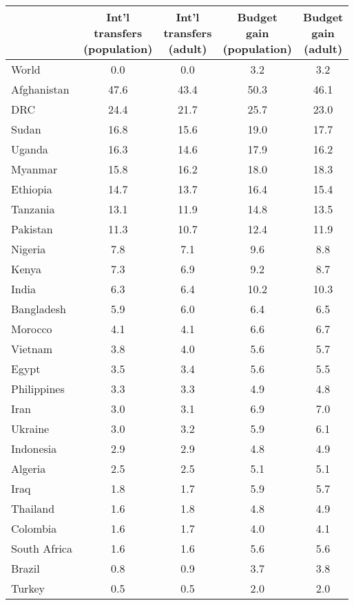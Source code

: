 
\begin{tabular}[t]{lcccc}
\toprule
  & \makecell{Int'l\\transfers\\(population)} & \makecell{Int'l\\transfers\\(adult)} & \makecell{Budget\\gain\\(population)} & \makecell{Budget\\gain\\(adult)}\\
\midrule
World & 0.0 & 0.0 & 3.2 & 3.2\\
Afghanistan & 47.6 & 43.4 & 50.3 & 46.1\\
DRC & 24.4 & 21.7 & 25.7 & 23.0\\
Sudan & 16.8 & 15.6 & 19.0 & 17.7\\
Uganda & 16.3 & 14.6 & 17.9 & 16.2\\
Myanmar & 15.8 & 16.2 & 18.0 & 18.3\\
Ethiopia & 14.7 & 13.7 & 16.4 & 15.4\\
Tanzania & 13.1 & 11.9 & 14.8 & 13.5\\
Pakistan & 11.3 & 10.7 & 12.4 & 11.9\\
Nigeria & 7.8 & 7.1 & 9.6 & 8.8\\
Kenya & 7.3 & 6.9 & 9.2 & 8.7\\
India & 6.3 & 6.4 & 10.2 & 10.3\\
Bangladesh & 5.9 & 6.0 & 6.4 & 6.5\\
Morocco & 4.1 & 4.1 & 6.6 & 6.7\\
Vietnam & 3.8 & 4.0 & 5.6 & 5.7\\
Egypt & 3.5 & 3.4 & 5.6 & 5.5\\
Philippines & 3.3 & 3.3 & 4.9 & 4.8\\
Iran & 3.0 & 3.1 & 6.9 & 7.0\\
Ukraine & 3.0 & 3.2 & 5.9 & 6.1\\
Indonesia & 2.9 & 2.9 & 4.8 & 4.9\\
Algeria & 2.5 & 2.5 & 5.1 & 5.1\\
Iraq & 1.8 & 1.7 & 5.9 & 5.7\\
Thailand & 1.6 & 1.8 & 4.8 & 4.9\\
Colombia & 1.6 & 1.7 & 4.0 & 4.1\\
South Africa & 1.6 & 1.6 & 5.6 & 5.6\\
Brazil & 0.8 & 0.9 & 3.7 & 3.8\\
Turkey & 0.5 & 0.5 & 2.0 & 2.0\\

\end{tabular}
